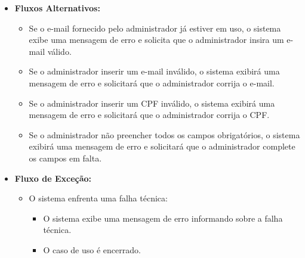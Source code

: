 \begin{itemize}
\begin{itemize}
            \item \textbf{Fluxos Alternativos:}
            \begin{itemize}
                \item Se o e-mail fornecido pelo administrador já estiver em uso, o sistema exibe uma mensagem de erro e solicita que o administrador insira um e-mail válido.
                \item Se o administrador inserir um e-mail inválido, o sistema exibirá uma mensagem de erro e solicitará que o administrador corrija o e-mail.
                \item Se o administrador inserir um CPF inválido, o sistema exibirá uma mensagem de erro e solicitará que o administrador corrija o CPF.
                \item Se o administrador não preencher todos os campos obrigatórios, o sistema exibirá uma mensagem de erro e solicitará que o administrador complete os campos em falta.
            \end{itemize}
            \item \textbf{Fluxo de Exceção:}
            \begin{itemize}
                \item O sistema enfrenta uma falha técnica:
                \begin{itemize}
                    \item O sistema exibe uma mensagem de erro informando sobre a falha técnica.
                    \item O caso de uso é encerrado.
                \end{itemize}
            \end{itemize}
        \end{itemize}
\end{itemize}

